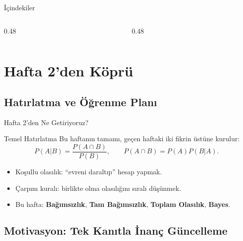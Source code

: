 \documentclass[light]{lutbeamer}
\begin{document}
\begin{frame}{İçindekiler}
  \scriptsize
  \begin{columns}[T]
    \begin{column}{0.48\textwidth}
      \tableofcontents[sections={1-4}]
    \end{column}
    \begin{column}{0.48\textwidth}
      \tableofcontents[sections={5-10}]
    \end{column}
  \end{columns}
\end{frame}



\section{Hafta 2'den Köprü}
\subsection{Hatırlatma ve Öğrenme Planı}

\begin{frame}{Hafta 2'den Ne Getiriyoruz?}
    \begin{block}{Temel Hatırlatma}
        Bu haftanın tamamı, geçen haftaki iki fikrin üstüne kurulur:
        \[
        P(A|B)=\frac{P(A\cap B)}{P(B)}, \qquad
        P(A\cap B)=P(A)P(B|A).
        \]
    \end{block}

    \begin{itemize}
        \item Koşullu olasılık: ``evreni daraltıp'' hesap yapmak.
        \item Çarpım kuralı: birlikte olma olasılığını sıralı düşünmek.
        \item Bu hafta: \textbf{Bağımsızlık}, \textbf{Tam Bağımsızlık}, \textbf{Toplam Olasılık}, \textbf{Bayes}.
    \end{itemize}
\end{frame}

\subsection{Motivasyon: Tek Kanıtla İnanç Güncelleme}
\end{document}

